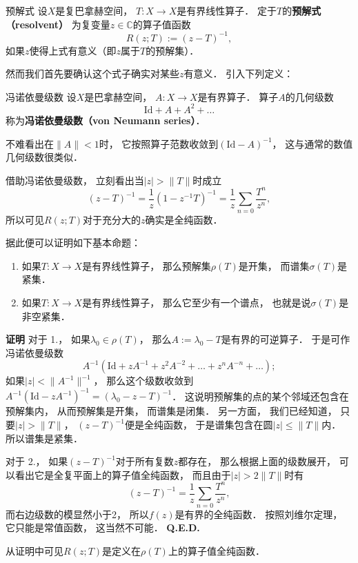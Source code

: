 

\begin{definition}{预解式}
设$X$是复巴拿赫空间， $T:X\to X$是有界线性算子． 定于$T$的\textbf{预解式（resolvent）} 为复变量$z\in\mathbb{C}$的算子值函数
$$
R(z;T):=(z-T)^{-1},
$$
如果$z$使得上式有意义（即$z$属于$T$的预解集）．
\end{definition}

然而我们首先要确认这个式子确实对某些$z$有意义． 引入下列定义：

\begin{definition}{冯诺依曼级数}
设$X$是巴拿赫空间， $A:X\to X$是有界算子． 算子$A$的几何级数
$$
\text{Id}+A+A^2+\dots
$$
称为\textbf{冯诺依曼级数（von Neumann series）}．
\end{definition}
不难看出在$\|A\|<1$时， 它按照算子范数收敛到$(\text{Id}-A)^{-1}$， 这与通常的数值几何级数很类似． 

借助冯诺依曼级数， 立刻看出当$|z|>\|T\|$时成立
$$
(z-T)^{-1}
=\frac{1}{z}(1-z^{-1}T)^{-1}
=\frac{1}{z}\sum_{n=0}\frac{T^n}{z^n},
$$
所以可见$R(z;T)$对于充分大的$z$确实是全纯函数．

据此便可以证明如下基本命题：

\begin{theorem}{}
\begin{enumerate}
\item 如果$T:X\to X$是有界线性算子， 那么预解集$\rho(T)$是开集， 而谱集$\sigma(T)$是紧集．
\item 如果$T:X\to X$是有界线性算子， 那么它至少有一个谱点， 也就是说$\sigma(T)$是非空紧集．
\end{enumerate}
\end{theorem}
\textbf{证明} 
对于 1.， 如果$\lambda_0\in\rho(T)$， 那么$A:=\lambda_0-T$是有界的可逆算子． 于是可作冯诺依曼级数
$$
A^{-1}(\text{Id}+zA^{-1}+z^2A^{-2}+\dots+z^nA^{-n}+\dots);
$$
如果$|z|<\|A^{-1}\|^{-1}$， 那么这个级数收敛到 $A^{-1}(\text{Id}-zA^{-1})^{-1}=(\lambda_0-z-T)^{-1}$． 这说明预解集的点的某个邻域还包含在预解集内， 从而预解集是开集， 而谱集是闭集． 另一方面， 我们已经知道， 只要$|z|>\|T\|$， $(z-T)^{-1}$便是全纯函数， 于是谱集包含在圆$|z|\leq\|T\|$内． 所以谱集是紧集．

对于 2.， 如果$(z-T)^{-1}$对于所有复数$z$都存在， 那么根据上面的级数展开， 可以看出它是全复平面上的算子值全纯函数， 而且由于$|z|>2\|T\|$时有
$$
(z-T)^{-1}=\frac{1}{z}\sum_{n=0}\frac{T^n}{z^n},
$$
而右边级数的模显然小于2， 所以$f(z)$是有界的全纯函数． 按照刘维尔定理， 它只能是常值函数， 这当然不可能． \textbf{Q.E.D.}

从证明中可见$R(z;T)$是定义在$\rho(T)$上的算子值全纯函数．